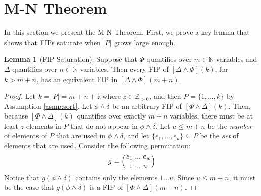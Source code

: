 \documentclass[12pt]{article}
\theoremstyle{definition}
\newtheorem{lemma}{Lemma}
\theoremstyle{remark}
\newcommand{\msp}{\text{ }}
\newcommand{\perm}{\genfrac{}{}{0pt}{}}
\begin{document}
\section{M-N Theorem}

In this section we present the M-N Theorem.  First, we prove a key lemma that shows that FIPs saturate when $|P|$ grows large enough.

\begin{lemma}[FIP Saturation]
  \label{lem:fip-sat}
  Suppose that $\Phi$ quantifies over $m \in \mathbb{N}$ variables and $\Delta$ quantifies over $n \in \mathbb{N}$ variables.  Then every FIP of $[\Delta \land \Phi](k)$, for $k > m+n$, has an equivalent FIP in $[\Delta \land \Phi](m+n)$.
\end{lemma}
\begin{proof}
  Let $k = |P| = m + n + z$ where $z \in \mathbb{Z}_{>0}$, and then $P = \{1,...,k\}$ by Assumption \ref{asmp:sort}.  Let $\phi\land\delta$ be an arbitrary FIP of $[\Phi\land\Delta](k)$.  Then, because $[\Phi\land\Delta](k)$ quantifies over exactly $m+n$ variables, there must be at least $z$ elements in $P$ that do not appear in $\phi\land\delta$.  Let $u \leq m+n$ be the \textit{number} of elements of $P$ that are used in $\phi \land \delta$, and let $\{e_1,...,e_u\} \subseteq P$ be the \textit{set} of elements that are used.  Consider the following permutation:
  $$g = \left(\perm{e_1 \msp ... \msp e_u}{1 \msp ... \msp u}\right)$$
  Notice that $g(\phi\land\delta)$ contains only the elements $1 ... u$.  Since $u \leq m+n$, it must be the case that $g(\phi\land\delta)$ is a FIP of $[\Phi \land \Delta](m+n)$.
\end{proof}
\end{document}
